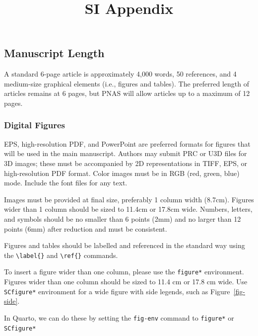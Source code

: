 \documentclass[
  letterpaper,
  DIV=11,
  numbers=noendperiod]{scrartcl}
\title{SI Appendix}
\author{}
\date{}
\begin{document}
\maketitle

\subsection*{Manuscript Length}\label{manuscript-length}

A standard 6-page article is approximately 4,000 words, 50 references,
and 4 medium-size graphical elements (i.e., figures and tables). The
preferred length of articles remains at 6 pages, but PNAS will allow
articles up to a maximum of 12 pages.

\subsubsection*{Digital Figures}\label{digital-figures}

EPS, high-resolution PDF, and PowerPoint are preferred formats for
figures that will be used in the main manuscript. Authors may submit PRC
or U3D files for 3D images; these must be accompanied by 2D
representations in TIFF, EPS, or high-resolution PDF format. Color
images must be in RGB (red, green, blue) mode. Include the font files
for any text.

Images must be provided at final size, preferably 1 column width
(8.7cm). Figures wider than 1 column should be sized to 11.4cm or 17.8cm
wide. Numbers, letters, and symbols should be no smaller than 6 points
(2mm) and no larger than 12 points (6mm) after reduction and must be
consistent.

Figures and tables should be labelled and referenced in the standard way
using the \texttt{\textbackslash{}label\{\}} and
\texttt{\textbackslash{}ref\{\}} commands.

To insert a figure wider than one column, please use the
\texttt{figure*} environment. Figures wider than one column should be
sized to 11.4 cm or 17.8 cm wide. Use \texttt{SCfigure*} environment for
a wide figure with side legends, such as Figure~\ref{fig-side}.

In Quarto, we can do these by setting the \texttt{fig-env} command to
\texttt{figure*} or \texttt{SCfigure*}
\end{document}
